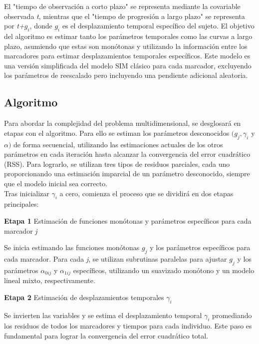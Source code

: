 \documentclass[12pt]{article}
\begin{document}
El "tiempo de observación a corto plazo" se representa mediante la covariable observada \textit{t}, mientras que el "tiempo de progresión a largo plazo" se representa por \textit{t+$g_{i}$}, donde $g_{i}$ es el desplazamiento temporal específico del sujeto. El objetivo del algoritmo es estimar tanto los parámetros temporales como las curvas a largo plazo, asumiendo que estas son monótonas y utilizando la información entre los marcadores para estimar desplazamientos temporales específicos. Este modelo es una versión simplificada del modelo SIM clásico para cada marcador, excluyendo los parámetros de reescalado pero incluyendo una pendiente adicional aleatoria.

\subsection{Algoritmo}
Para abordar la complejidad del problema multidimensional, se desglosará en etapas con el algoritmo. Para ello se estiman los parámetros desconocidos $(g_{j}, \gamma_{i}$ y $\alpha)$ de forma secuencial, utilizando las estimaciones actuales de los otros parámetros en cada iteración hasta alcanzar la convergencia del error cuadrático (RSS). Para lograrlo, se utilizan tres tipos de residuos parciales, cada uno proporcionando una estimación imparcial de un parámetro desconocido, siempre que el modelo inicial sea correcto.\\

Tras inicializar $\gamma_{i}$ a cero, comienza el proceso que se dividirá en dos etapas principales:
\begin{description}
	\item {\textbf{Etapa 1}} Estimación de funciones monótonas y parámetros específicos para cada marcador \textit{j}
	
	Se inicia estimando las funciones monótonas $g_{j}$	y los parámetros específicos para cada marcador. Para cada \textit{j}, se utilizan subrutinas paralelas para ajustar $g_{j}$
	y los parámetros $\alpha_{0ij}$ y $\alpha_{1ij}$ específicos, utilizando un suavizado monótono y un modelo lineal mixto, respectivamente.
	\item {\textbf{Etapa 2}} Estimación de desplazamientos temporales $\gamma_{i}$
	
	Se invierten las variables y se estima el desplazamiento temporal $\gamma_{i}$ promediando los residuos de todos los marcadores y tiempos para cada individuo. Este paso es fundamental para lograr la convergencia del error cuadrático total.
\end{description}
\end{document}
